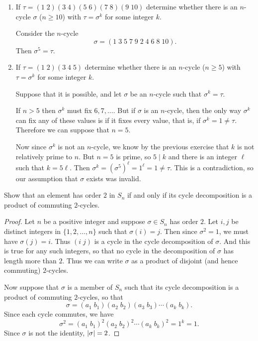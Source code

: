 \begin{enumerate}
\item If $\tau = (1\;2)(3\;4)(5\;6)(7\;8)(9\;10)$ determine whether
  there is an $n$-cycle $\sigma$ ($n\geq10$) with $\tau = \sigma^k$
  for some integer $k$.
  \begin{solution}
    Consider the $n$-cycle
    \begin{equation*}
      \sigma = (1\;3\;5\;7\;9\;2\;4\;6\;8\;10).
    \end{equation*}
    Then $\sigma^5 = \tau$.
  \end{solution}
\item If $\tau = (1\;2)(3\;4\;5)$ determine whether there is an
  $n$-cycle ($n\geq5$) with $\tau = \sigma^k$ for some integer $k$.
  \begin{solution}
    Suppose that it is possible, and let $\sigma$ be an $n$-cycle such
    that $\sigma^k = \tau$.

    If $n>5$ then $\sigma^k$ must fix $6, 7, \dots$. But if $\sigma$
    is an $n$-cycle, then the only way $\sigma^k$ can fix any of these
    values is if it fixes every value, that is, if
    $\sigma^k = 1 \neq \tau$. Therefore we can suppose that $n = 5$.

    Now since $\sigma^k$ is not an $n$-cycle, we know by the previous
    exercise that $k$ is not relatively prime to $n$. But $n = 5$ is
    prime, so $5\mid k$ and there is an integer $\ell$ such that
    $k = 5\ell$. Then
    $\sigma^k = (\sigma^5)^\ell = 1^\ell = 1\neq\tau$. This is a
    contradiction, so our assumption that $\sigma$ exists was invalid.
  \end{solution}
\end{enumerate}

 Show that an element has order $2$ in $S_n$ if and only
if its cycle decomposition is a product of commuting $2$-cycles.
\begin{proof}
  Let $n$ be a positive integer and suppose $\sigma\in S_n$ has order
  $2$. Let $i,j$ be distinct integers in $\{1, 2, \dots, n\}$ such
  that $\sigma(i) = j$. Then since $\sigma^2 = 1$, we must have
  $\sigma(j) = i$. Thus $(i\;j)$ is a cycle in the cycle decomposition
  of $\sigma$. And this is true for any such integers, so that no
  cycle in the decomposition of $\sigma$ has length more than
  $2$. Thus we can write $\sigma$ as a product of disjoint (and hence
  commuting) $2$-cycles.

  Now suppose that $\sigma$ is a member of $S_n$ such that its cycle
  decomposition is a product of commuting $2$-cycles, so that
  \begin{equation*}
    \sigma = (a_1\;b_1)(a_2\;b_2)(a_3\;b_3)\cdots(a_k\;b_k).
  \end{equation*}
  Since each cycle commutes, we have
  \begin{equation*}
    \sigma^2 = (a_1\;b_1)^2(a_2\;b_2)^2\cdots(a_k\;b_k)^2 = 1^k = 1.
  \end{equation*}
  Since $\sigma$ is not the identity, $\lvert{\sigma}\rvert = 2$.
\end{proof}

